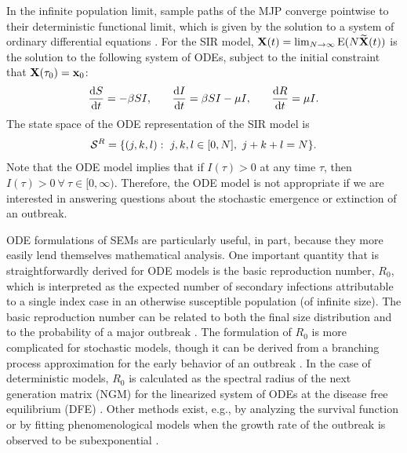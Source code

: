 In the infinite population limit, sample paths of the MJP converge pointwise to their deterministic functional limit, which is given by the solution to a system of ordinary differential equations \cite{greenwood2009stochastic,kurtz1981approximation}. For the SIR model, $ \mathbf{X}(t)  = \lim_{N \rightarrow \infty} \mathrm{E}(N\widetilde{\mathbf{X}}(t))$ is the solution to the following system of ODEs, subject to the initial constraint that $ \mathbf{X}(\tau_0) = \mathbf{x}_0 $:
\begin{align*}
\frac{\mathrm{d} S}{\mathrm{d} t} = -\beta S I,\hspace{0.25in} 
\frac{\mathrm{d} I}{\mathrm{d} t} = \beta S I - \mu I,\hspace{0.25in} 
\frac{\mathrm{d} R}{\mathrm{d} t} = \mu I.
\end{align*}
The state space of the ODE representation of the SIR model is $$ \mcS^R =  \lbrace(j,k,l):\ j,k,l\in[0,N],\  j+k+l = N\rbrace. $$ Note that the ODE model implies that if $ I(\tau) > 0 $ at any time $ \tau $, then $ I(\tau) > 0\ \forall\ \tau\in[0,\infty)$. Therefore, the ODE model is not appropriate if we are interested in answering questions about the stochastic emergence or extinction of an outbreak.

ODE formulations of SEMs are particularly useful, in part, because they more easily lend themselves mathematical analysis. One important quantity that is straightforwardly derived for ODE models is the basic reproduction number, $ R_0 $, which is interpreted as the expected number of secondary infections attributable to a single index case in an otherwise susceptible population (of infinite size). The basic reproduction number can be related to both the final size distribution and to the probability of a major outbreak \cite{allen2017primer,greenwood2009stochastic,miller2012note}. The formulation of $ R_0 $ is more complicated for stochastic models, though it can be derived from a branching process approximation for the early behavior of an outbreak \cite{allen2008introduction}. In the case of deterministic models, $ R_0 $ is calculated as the spectral radius of the next generation matrix (NGM) for the linearized system of ODEs at the disease free equilibrium (DFE) \cite{diekmann2009construction,van2017reproduction}. Other methods exist, e.g., by analyzing the survival function or by fitting phenomenological models when the growth rate of the outbreak is observed to be subexponential \cite{van2017reproduction}.

